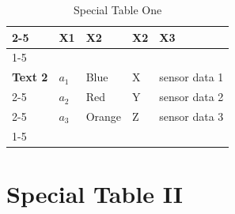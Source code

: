\begin{table}[h]
	\begin{singlespace}
		\caption{Special Table One}

			
			\renewcommand{\arraystretch}{1.25}
			\centering
			
			\begin{tabular}{ |m{0.8cm} |m{1cm}  |m{2.2cm} |m{3cm} |m{4cm}|} 
				\cline{2-5} %
				\multicolumn{1}{c}{} \vline &   \textbf{X1}  & \textbf{X2} & \textbf{X2} & \textbf{X3} \\ 
				
				\cline{1-5}
				
				\multirow{3}{*}{\rotatebox[origin=c]{90}{ \shortstack {\textbf{Text 1}  \\ \textbf{Text 2}}}}
				&$a_1$ & Blue &X &sensor data 1\\		
				\cline{2-5}
				&$a_2$ & Red  &Y &sensor data 2\\
				\cline{2-5}
				&$a_3$ & Orange &Z &sensor data 3 \\	
				
				\cline{1-5}
				
				
				
			\end{tabular}
		\end{singlespace}
		

	
\end{table}



\section{Special Table II}



